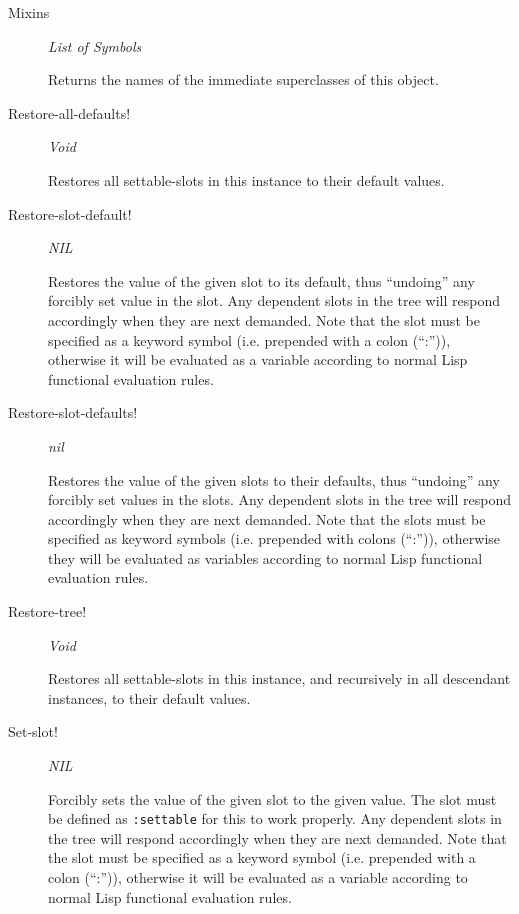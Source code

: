 \documentclass [11pt]{book}
\begin{document}
\begin{itemize}
\begin{description}
\item [Mixins]
\emph{List of Symbols}

 Returns the names of the immediate superclasses of this object.




\item [Restore-all-defaults!]
\emph{Void}

 Restores all settable-slots in this instance to their default values.




\item [Restore-slot-default!]
\emph{NIL}

 Restores the value of the given slot to its default, thus ``undoing'' any forcibly set value
in the slot. Any dependent slots in the tree will respond accordingly when they are next demanded.
Note that the slot must be specified as a keyword symbol (i.e. prepended with a colon (``:'')),
otherwise it will be evaluated as a variable according to normal Lisp functional evaluation rules.




\item [Restore-slot-defaults!]
\emph{nil}

 Restores the value of the given slots to their defaults, thus ``undoing'' any forcibly set values
in the slots. Any dependent slots in the tree will respond accordingly when they are next demanded.
Note that the slots must be specified as keyword symbols (i.e. prepended with colons (``:'')),
otherwise they will be evaluated as variables according to normal Lisp functional evaluation rules.




\item [Restore-tree!]
\emph{Void}

 Restores all settable-slots in this instance, and
recursively in all descendant instances, to their default values.




\item [Set-slot!]
\emph{NIL}

 Forcibly sets the value of the given slot to the given value. The slot must be defined
as \texttt{:settable} for this to work properly. Any dependent slots in the tree will
respond accordingly when they are next demanded. Note that the slot must be specified as a keyword
symbol (i.e. prepended with a colon (``:'')), otherwise it will be evaluated as a variable according
to normal Lisp functional evaluation rules.




\end{description}
\end{itemize}
\end{document}
